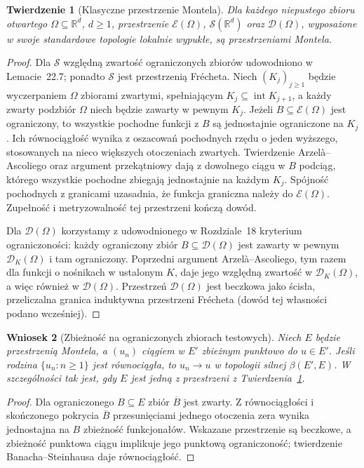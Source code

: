 \documentclass[11pt,a4paper]{article}
\numberwithin{equation}{section}
\theoremstyle{plain}
\newtheorem{twierdzenie}{Twierdzenie}[section]
\newtheorem{wniosek}[twierdzenie]{Wniosek}
\theoremstyle{definition}
\theoremstyle{remark}
\newcommand{\R}{\mathbb R}
\begin{document}
\begin{twierdzenie}[Klasyczne przestrzenie Montela]
\label{thm:montel-test23}
Dla każdego niepustego zbioru otwartego $\Omega\subseteq\R^d$,
$d\ge1$, przestrzenie $\mathcal E(\Omega)$,
$\mathcal S(\R^d)$ oraz $\mathcal D(\Omega)$, wyposażone
w swoje standardowe topologie lokalnie wypukłe, są przestrzeniami
Montela.
\end{twierdzenie}
\begin{proof}
Dla $\mathcal S$ względną zwartość ograniczonych zbiorów
udowodniono w Lemacie~\textup{22.7}; ponadto
$\mathcal S$ jest przestrzenią Frécheta.
Niech $(K_j)_{j\ge1}$ będzie wyczerpaniem $\Omega$ zbiorami
zwartymi, spełniającym $K_j\subseteq\operatorname{int}K_{j+1}$,
a każdy zwarty podzbiór $\Omega$ niech będzie zawarty w pewnym
$K_j$. Jeżeli $B\subseteq\mathcal E(\Omega)$ jest ograniczony,
to wszystkie pochodne funkcji z $B$ są jednostajnie ograniczone
na $K_j$. Ich równociągłość wynika z oszacowań pochodnych
rzędu o jeden wyższego, stosowanych na nieco większych
otoczeniach zwartych. Twierdzenie Arzelà--Ascoliego oraz
argument przekątniowy dają z dowolnego ciągu w $B$ podciąg,
którego wszystkie pochodne zbiegają jednostajnie na każdym
$K_j$. Spójność pochodnych z granicami uzasadnia, że
funkcja graniczna należy do $\mathcal E(\Omega)$.
Zupełność i metryzowalność tej przestrzeni kończą dowód.

Dla $\mathcal D(\Omega)$ korzystamy z udowodnionego w
Rozdziale~\textup{18} kryterium ograniczoności:
każdy ograniczony zbiór $B\subseteq\mathcal D(\Omega)$
jest zawarty w pewnym $\mathcal D_K(\Omega)$ i tam ograniczony.
Poprzedni argument Arzelà--Ascoliego, tym razem dla
funkcji o nośnikach w ustalonym $K$, daje jego względną
zwartość w $\mathcal D_K(\Omega)$, a więc również
w $\mathcal D(\Omega)$. Przestrzeń $\mathcal D(\Omega)$
jest beczkowa jako ścisła, przeliczalna granica induktywna
przestrzeni Frécheta (dowód tej własności podano wcześniej).
\end{proof}

\begin{wniosek}[Zbieżność na ograniczonych zbiorach testowych]
\label{cor:montel-dual-seq23}
Niech $E$ będzie przestrzenią Montela, a $(u_n)$ ciągiem w
$E'$ zbieżnym punktowo do $u\in E'$. Jeśli rodzina
$\{u_n:n\ge1\}$ jest równociągła, to $u_n\to u$
w topologii silnej $\beta(E',E)$. W szczególności tak jest,
gdy $E$ jest jedną z przestrzeni z
Twierdzenia~\ref{thm:montel-test23}.
\end{wniosek}
\begin{proof}
Dla ograniczonego $B\subseteq E$ zbiór $\overline B$
jest zwarty. Z równociągłości i skończonego pokrycia
$\overline B$ przesunięciami jednego otoczenia zera
wynika jednostajna na $B$ zbieżność funkcjonałów.
Wskazane przestrzenie są beczkowe, a zbieżność punktowa
ciągu implikuje jego punktową ograniczoność;
twierdzenie Banacha--Steinhausa daje równociągłość.
\end{proof}
\end{document}
